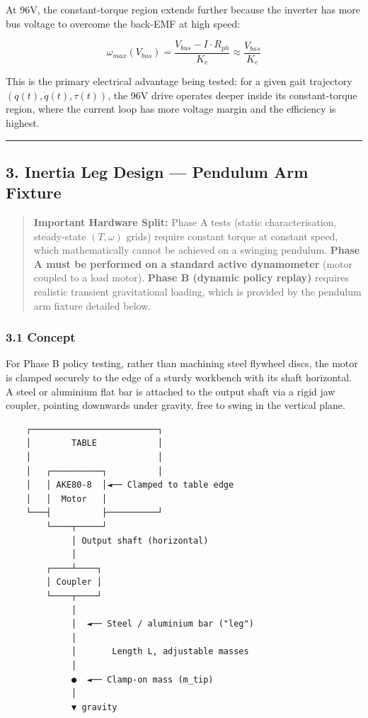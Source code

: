 \documentclass[
]{article}
\begin{document}
At 96V, the constant-torque region extends further because the inverter
has more bus voltage to overcome the back-EMF at high speed:

\[
\omega_{max}(V_{bus}) = \frac{V_{bus} - I \cdot R_{ph}}{K_e} \approx \frac{V_{bus}}{K_e}
\]

This is the primary electrical advantage being tested: for a given gait
trajectory \((q(t), \dot{q}(t), \tau(t))\), the 96V drive operates
deeper inside its constant-torque region, where the current loop has
more voltage margin and the efficiency is highest.

\begin{center}\rule{0.5\linewidth}{0.5pt}\end{center}

\subsection{3. Inertia Leg Design --- Pendulum Arm
Fixture}\label{inertia-leg-design-pendulum-arm-fixture}

\begin{quote}
\textbf{Important Hardware Split:} Phase A tests (static
characterisation, steady-state \((T, \omega)\) grids) require constant
torque at constant speed, which mathematically cannot be achieved on a
swinging pendulum. \textbf{Phase A must be performed on a standard
active dynamometer} (motor coupled to a load motor). \textbf{Phase B
(dynamic policy replay)} requires realistic transient gravitational
loading, which is provided by the pendulum arm fixture detailed below.
\end{quote}

\subsubsection{3.1 Concept}\label{concept}

For Phase B policy testing, rather than machining steel flywheel discs,
the motor is clamped securely to the edge of a sturdy workbench with its
shaft horizontal. A steel or aluminium flat bar is attached to the
output shaft via a rigid jaw coupler, pointing downwards under gravity,
free to swing in the vertical plane.

\begin{verbatim}
    ┌─────────────────────────┐
    │        TABLE            │
    │                         │
    │   ┌──────────┐          │
    │   │ AKE80-8  │◄── Clamped to table edge
    │   │  Motor   │
    └───┤          ├──────────┘
        └────┬─────┘
             │ Output shaft (horizontal)
             │
        ┌────┴────┐
        │ Coupler │
        └────┬────┘
             │
             │  ◄── Steel / aluminium bar ("leg")
             │
             │       Length L, adjustable masses
             │
             ●  ◄── Clamp-on mass (m_tip)
             │
             ▼ gravity
\end{verbatim}
\end{document}
